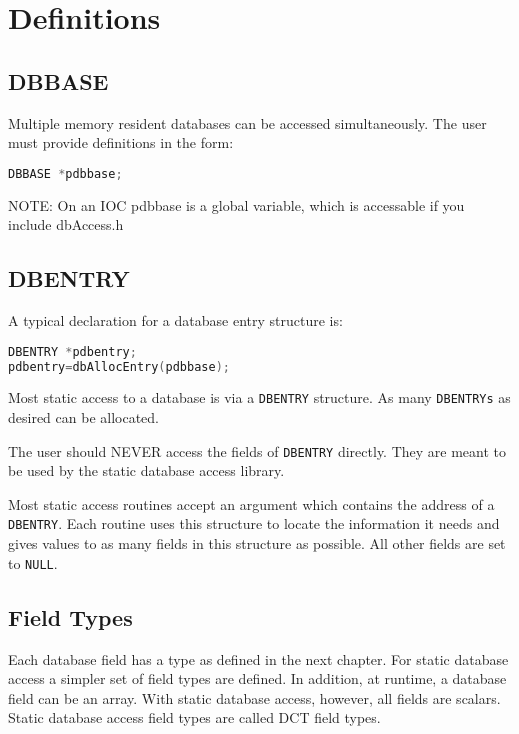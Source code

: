 \section{Definitions}

\subsection{DBBASE}

Multiple memory resident databases can be accessed simultaneously.
The user must provide definitions in the form:

\begin{lstlisting}[language=C]
DBBASE *pdbbase;
\end{lstlisting}

NOTE: On an IOC pdbbase is a global variable, which is accessable if you include dbAccess.h

\subsection{DBENTRY}

A typical declaration for a database entry structure is:

\begin{lstlisting}[language=C]
DBENTRY *pdbentry;
pdbentry=dbAllocEntry(pdbbase);
\end{lstlisting}

Most static access to a database is via a \verb|DBENTRY| structure.
As many \verb|DBENTRYs| as desired can be allocated.

The user should NEVER access the fields of \verb|DBENTRY| directly.
They are meant to be used by the static database access library.

Most static access routines accept an argument which contains the address of a \verb|DBENTRY|.
Each routine uses this structure to locate the information it needs and gives values to as many fields in this structure as possible.
All other fields are set to \verb|NULL|.

\subsection{Field Types}
\label{subsec:Field Types}

Each database field has a type as defined in the next chapter.
For static database access a simpler set of field types are defined.
In addition, at runtime, a database field can be an array.
With static database access, however, all fields are scalars.
Static database access field types are called DCT field types.

